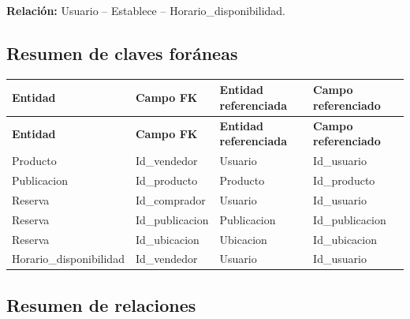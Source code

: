 \documentclass[12pt]{article} %
\begin{document}
\textbf{Relación:}
Usuario -- Establece -- Horario\_disponibilidad.



\subsection{Resumen de claves foráneas}

\begin{longtable}{>{\raggedright\arraybackslash}p{3.5cm}
                  >{\raggedright\arraybackslash}p{3.5cm}
                  >{\raggedright\arraybackslash}p{4.0cm}
                  >{\raggedright\arraybackslash}p{3.5cm}}
\toprule
\textbf{Entidad} &
\textbf{Campo FK} &
\textbf{Entidad referenciada} &
\textbf{Campo referenciado} \\
\midrule
\endfirsthead

\toprule
\textbf{Entidad} &
\textbf{Campo FK} &
\textbf{Entidad referenciada} &
\textbf{Campo referenciado} \\
\midrule
\endhead

Producto &
Id\_vendedor &
Usuario &
Id\_usuario \\

Publicacion &
Id\_producto &
Producto &
Id\_producto \\

Reserva &
Id\_comprador &
Usuario &
Id\_usuario \\

Reserva &
Id\_publicacion &
Publicacion &
Id\_publicacion \\

Reserva &
Id\_ubicacion &
Ubicacion &
Id\_ubicacion \\

Horario\_disponibilidad &
Id\_vendedor &
Usuario &
Id\_usuario \\

\bottomrule
\end{longtable}



\subsection{Resumen de relaciones}
\end{document}
